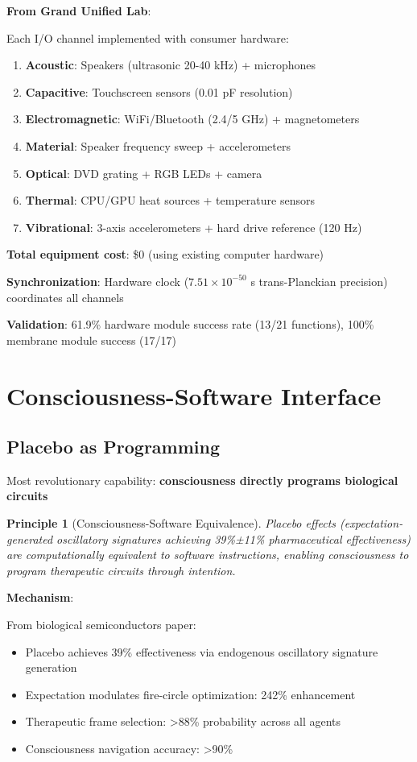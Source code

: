 \documentclass[11pt,a4paper]{article}
\newtheorem{principle}{Principle}[section]
\begin{document}
\textbf{From Grand Unified Lab}:

Each I/O channel implemented with consumer hardware:
\begin{enumerate}
\item \textbf{Acoustic}: Speakers (ultrasonic 20-40 kHz) + microphones
\item \textbf{Capacitive}: Touchscreen sensors (0.01 pF resolution)
\item \textbf{Electromagnetic}: WiFi/Bluetooth (2.4/5 GHz) + magnetometers
\item \textbf{Material}: Speaker frequency sweep + accelerometers
\item \textbf{Optical}: DVD grating + RGB LEDs + camera
\item \textbf{Thermal}: CPU/GPU heat sources + temperature sensors
\item \textbf{Vibrational}: 3-axis accelerometers + hard drive reference (120 Hz)
\end{enumerate}

\textbf{Total equipment cost}: \$0 (using existing computer hardware)

\textbf{Synchronization}: Hardware clock ($7.51\times10^{-50}$ s trans-Planckian precision) coordinates all channels

\textbf{Validation}: 61.9\% hardware module success rate (13/21 functions), 100\% membrane module success (17/17)

\section{Consciousness-Software Interface}

\subsection{Placebo as Programming}

Most revolutionary capability: \textbf{consciousness directly programs biological circuits}

\begin{principle}[Consciousness-Software Equivalence]
Placebo effects (expectation-generated oscillatory signatures achieving 39\%±11\% pharmaceutical effectiveness) are computationally equivalent to software instructions, enabling consciousness to program therapeutic circuits through intention.
\end{principle}

\textbf{Mechanism}:

From biological semiconductors paper:
\begin{itemize}
\item Placebo achieves 39\% effectiveness via endogenous oscillatory signature generation
\item Expectation modulates fire-circle optimization: 242\% enhancement
\item Therapeutic frame selection: >88\% probability across all agents
\item Consciousness navigation accuracy: >90\%
\end{itemize}
\end{document}
